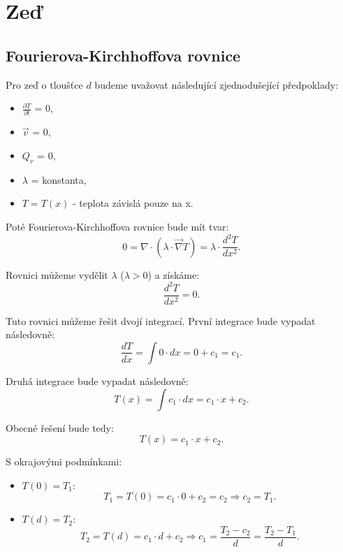 \documentclass{article}
\begin{document}
\maketitle
\tableofcontents
\newpage



\section{ Zeď \spicy \spicy}


\subsection{Fourierova-Kirchhoffova rovnice \spicy \spicy \spicy}
Pro zeď o tloušťce $d$ budeme uvažovat následující zjednodušející předpoklady:
\begin{itemize}
    \item $\frac{\partial T}{\partial t}$ = 0,
    \item $\vec{v}$ = 0,
    \item $Q_v$ = 0,
    \item $\lambda$ = konstanta,
    \item $T = T(x)$ - teplota závislá pouze na x.
\end{itemize}

Poté Fourierova-Kirchhoffova rovnice bude mít tvar:
$$
    0 = \nabla \cdot \left( \lambda \cdot \vec{\nabla} T \right) = \lambda \cdot \frac{d^2 T}{d x^2}.
$$

Rovnici můžeme vydělit $\lambda$ ($\lambda > 0$) a získáme:
$$
    \frac{d^2 T}{d x^2} = 0.
$$

Tuto rovnici můžeme řešit dvojí integrací. První integrace bude vypadat následovně:
$$
    \frac{d T}{d x} = \int 0 \cdot dx = 0 + c_1 = c_1.
$$

Druhá integrace bude vypadat následovně:
$$
    T(x) = \int c_1 \cdot dx = c_1 \cdot x + c_2.
$$

Obecné řešení bude tedy:
$$
    T(x) = c_1 \cdot x + c_2.
$$

S okrajovými podmínkami:
\begin{itemize}
    \item $T(0) = T_1$:
          $$
              T_1 = T(0) = c_1 \cdot 0 + c_2 = c_2 \Rightarrow c_2 = T_1.
          $$
    \item $T(d) = T_2$:
          $$
              T_2 = T(d) = c_1 \cdot d + c_2 \Rightarrow c_1 = \frac{T_2 - c_2}{d} = \frac{T_2 - T_1}{d}.
          $$
\end{itemize}
\end{document}
